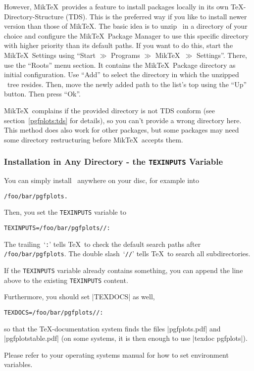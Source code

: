 However, Mik\TeX\ provides a feature to install packages locally in its own \TeX-Directory-Structure (TDS). This is the preferred way if you like to install newer version than those of Mik\TeX. The basic idea is to unzip \PGFPlots\ in a directory of your choice and configure the Mik\TeX\ Package Manager to use this specific directory with higher priority than its default paths. If you want to do this, start the Mik\TeX\ Settings using ``Start $\gg$ Programs $\gg$ Mik\TeX\ $\gg$ Settings''. There, use the ``Roots'' menu section. It contains the Mik\TeX\ Package directory as initial configuration. Use ``Add'' to select the directory in which the unzipped \PGFPlots\ tree resides. Then, move the newly added path to the list's top using the ``Up'' button. Then press ``Ok''. 

Mik\TeX\ complains if the provided directory is not TDS conform (see section~\ref{pgfplots:tds} for details), so you can't provide a wrong directory here. This method does also work for other packages, but some packages may need some directory restructuring before Mik\TeX\ accepts them.

\subsubsection{Installation in Any Directory - the \texttt{TEXINPUTS} Variable}
You can simply install \PGFPlots\ anywhere on your disc, for example into
\begin{verbatim}
/foo/bar/pgfplots.
\end{verbatim}
Then, you set the \texttt{TEXINPUTS} variable to
\begin{verbatim}
TEXINPUTS=/foo/bar/pgfplots//:
\end{verbatim}
The trailing~`\texttt{:}' tells \TeX\ to check the default search paths after \lstinline!/foo/bar/pgfplots!. The double slash~`\texttt{//}' tells \TeX\ to search all subdirectories.

If the \texttt{TEXINPUTS} variable already contains something, you can append the line above to the existing \texttt{TEXINPUTS} content.

Furthermore, you should set |TEXDOCS| as well,
\begin{verbatim}
TEXDOCS=/foo/bar/pgfplots//:
\end{verbatim}
so that the \TeX-documentation system finds the files |pgfplots.pdf| and |pgfplotstable.pdf| (on some systems, it is then enough to use |texdoc pgfplots|).

Please refer to your operating systems manual for how to set environment variables.

